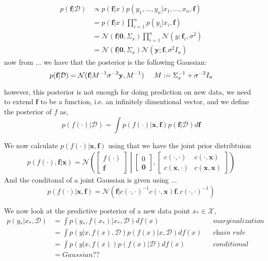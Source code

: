 \begin{align*}
    p(\textbf{f}|\mathcal{D}) &\propto p(\textbf{f}|x)p(y_1,\dots,y_n|x_1,\dots,x_n,\textbf{f})\\
    &= p(\textbf{f}|x)\prod_{i=1}^n p(y_i|x_i,\textbf{f})\\
    &= \mathcal{N}(\textbf{f}|\textbf{0}, \Sigma_x) \prod_{i=1}^n \mathcal{N}(y;\textbf{f}_i,\sigma^2)\\
    &= \mathcal{N}(\textbf{f}|\textbf{0}, \Sigma_x) \mathcal{N}(\textbf{y};\textbf{f},\sigma^2 I_n)
\end{align*}
now from ... we have that the posterior is the following Gaussian: 
\begin{equation*}
    p(\textbf{f}|\mathcal{D}) = \mathcal{N}(\textbf{f}|M^{-1} \sigma^{-2}\textbf{y}, M^{-1}) \hspace{0.5cm}M := \Sigma_x^{-1}+\sigma^{-2} I_n
\end{equation*}


however, this posterior is not enough for doing prediction on new data, we 
need to extend $\textbf{f}$ to be a function, i.e. an infinitely dimentional vector, 
and we define the posterior of $f$ as, 
$$p(f(\cdot)|\mathcal{D}) = \int p(f(\cdot)|\textbf{x}, \textbf{f})p(\textbf{f}|\mathcal{D})d\textbf{f}$$

We now calculate $p(f(\cdot)|\textbf{x}, \textbf{f})$ using that we have the joint prior distribtuion 
\begin{align}
    p(f(\cdot),\textbf{f}|\textbf{x}) = \mathcal{N}\left(\begin{bmatrix}
        f(\cdot)\\ \textbf{f}
    \end{bmatrix} \middle| \begin{bmatrix}
        0\\ \textbf{0}
    \end{bmatrix}, \begin{bmatrix}
        c(\cdot, \cdot) & c(\cdot,\textbf{x})\\
        c(\textbf{x}, \cdot) & c(\textbf{x}, \textbf{x})
    \end{bmatrix} \right)
\end{align}
And the conditonal of a joint Gaussian is given using ... 
$$p(f(\cdot)|\textbf{x}, \textbf{f}) = \mathcal{N}(\textbf{f}|c(\cdot, \cdot)^{-1}c(\cdot, \textbf{x})\textbf{f}, c(\cdot, \cdot)^{-1})$$


We now look at the predictive posterior of a new data point $x_* \in \mathcal{X}$, 
\begin{align*}
    p(y_{*}|x_{*}, \mathcal{D}) &= \int p(y_{*},f(x_{*})|x_{*},  \mathcal{D}) df(x) &&\textit{marginalization}\\
    &= \int p(y|x, f(x), \mathcal{D}) p(f(x)|x, \mathcal{D}) df(x) &&\textit{chain rule} \\
    &= \int p(y|x, f(x)) p(f(x)| \mathcal{D}) df(x) &&\textit{conditional indepencies}\\
    &= Gaussian ?? 
\end{align*}

